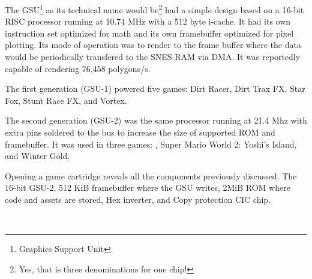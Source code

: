 \par
The GSU\footnote{Graphics Support Unit} as its technical name would be\footnote{Yes, that is three denominations for one chip!} had a simple design based on a 16-bit RISC processor running at 10.74 MHz with a 512 byte i-cache. It had its own instruction set optimized for math and its own framebuffer optimized for pixel plotting. Its mode of operation was to render to the frame buffer where the data would be periodically transfered to the SNES RAM via DMA. It was reportedly capable of rendering 76,458 polygons/s.\\

\par
The first generation (GSU-1) powered five games: Dirt Racer, Dirt Trax FX, Star Fox, Stunt Race FX, and Vortex.\\
\par
 The second generation (GSU-2) was the same processor running at 21.4 Mhz with extra pins soldered to the bus to increase the size of supported ROM and framebuffer. It was used in three games: \doom{}, Super Mario World 2: Yoshi's Island, and Winter Gold.\\
\par
Opening a \doom{} game cartridge reveals all the components previously discussed.  The 16-bit GSU-2,  512 KiB framebuffer where the GSU writes,  2MiB ROM where code and assets are stored,  Hex inverter, and  Copy protection CIC chip.







\\
\par

\pagebreak


